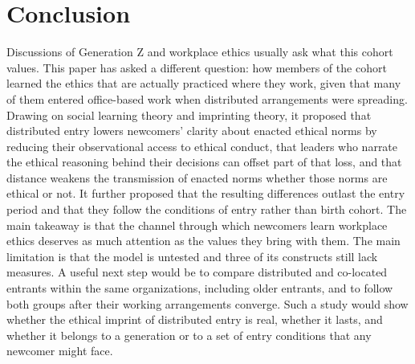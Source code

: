 \section{Conclusion}
Discussions of Generation Z and workplace ethics usually ask what this cohort values. This paper has asked a different question: how members of the cohort learned the ethics that are actually practiced where they work, given that many of them entered office-based work when distributed arrangements were spreading. Drawing on social learning theory and imprinting theory, it proposed that distributed entry lowers newcomers' clarity about enacted ethical norms by reducing their observational access to ethical conduct, that leaders who narrate the ethical reasoning behind their decisions can offset part of that loss, and that distance weakens the transmission of enacted norms whether those norms are ethical or not. It further proposed that the resulting differences outlast the entry period and that they follow the conditions of entry rather than birth cohort. The main takeaway is that the channel through which newcomers learn workplace ethics deserves as much attention as the values they bring with them. The main limitation is that the model is untested and three of its constructs still lack measures. A useful next step would be to compare distributed and co-located entrants within the same organizations, including older entrants, and to follow both groups after their working arrangements converge. Such a study would show whether the ethical imprint of distributed entry is real, whether it lasts, and whether it belongs to a generation or to a set of entry conditions that any newcomer might face.
